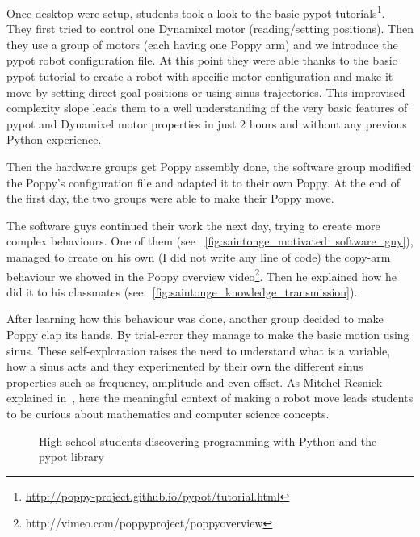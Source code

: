 Once desktop were setup, students took a look to the basic pypot tutorials\footnote{\url{http://poppy-project.github.io/pypot/tutorial.html}}. They first tried to control one Dynamixel motor (reading/setting positions). Then they use a group of motors (each having one Poppy arm) and we introduce the pypot robot configuration file. At this point they were able thanks to the basic pypot tutorial to create a robot with specific motor configuration and make it move by setting direct goal positions or using sinus trajectories. This improvised complexity slope leads them to a well understanding of the very basic features of pypot and Dynamixel motor properties in just 2 hours and without any previous Python experience.

Then the hardware groups get Poppy assembly done, the software group modified the Poppy's configuration file and adapted it to their own Poppy. At the end of the first day, the two groups were able to make their Poppy move.

The software guys continued their work the next day, trying to create more complex behaviours. One of them (see \figurename~\ref{fig:saintonge_motivated_software_guy}), managed to create on his own (I did not write any line of code) the copy-arm behaviour we showed in the Poppy overview video\footnote{http://vimeo.com/poppyproject/poppyoverview}. Then he explained how he did it to his classmates (see \figurename~\ref{fig:saintonge_knowledge_transmission}).

After learning how this behaviour was done, another group decided to make Poppy clap its hands. By trial-error they manage to make the basic motion using sinus. These self-exploration raises the need to understand what is a variable, how a sinus acts and they experimented by their own the different sinus properties such as frequency, amplitude and even offset. As Mitchel Resnick explained in~\cite{resnick2009scratch}, here the meaningful context of making a robot move leads students to be curious about mathematics and computer science concepts.


\begin{figure}[]
\centering
    \hfil
    \hfil
    \hfil
    \caption{High-school students discovering programming with Python and the pypot library}
    \label{fig:saintonge_software}
\end{figure}

